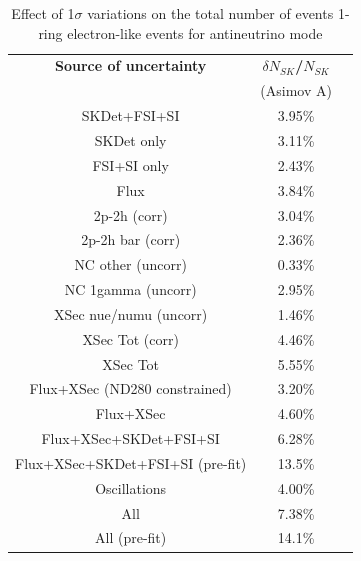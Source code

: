 \begin{table}[htb]
\centering
\begin{tabular}{| c | c | c |}
\hline
  {\bf Source of uncertainty}    & \multicolumn{1}{c|}{{\bf ${\delta}N_{SK}$/$N_{SK}$}}\\
                                 & \multicolumn{1}{c|}{(Asimov A)}\\

\hline
\hline  
SKDet+FSI+SI                   & 3.95\%                        \\
SKDet only                   & 3.11\%                        \\
FSI+SI only                   & 2.43\%                        \\
\hline
  Flux                           & 3.84\%                        \\
\hline
\hline
  2p-2h (corr)                     & 3.04\%                        \\
  2p-2h bar (corr)                  & 2.36\%                        \\
  NC other (uncorr)              & 0.33\%                        \\
  NC 1gamma (uncorr)             & 2.95\%                        \\
  XSec nue/numu (uncorr)                 & 1.46\%                        \\
\hline
  XSec Tot (corr)                  & 4.46\%                        \\
  XSec Tot                       & 5.55\%                        \\
\hline
\hline
  Flux+XSec (ND280 constrained)                      & 3.20\%                        \\
  Flux+XSec                      & 4.60\%                        \\
\hline
  Flux+XSec+SKDet+FSI+SI         & 6.28\%                        \\
  Flux+XSec+SKDet+FSI+SI (pre-fit)         & 13.5\%                        \\
\hline
\hline
  Oscillations                   & 4.00\%                        \\
\hline
\hline
  All                            & 7.38\%                        \\
      All (pre-fit) 		& 14.1\%				\\
\hline
\hline
\end{tabular}
\caption{
 Effect of 1$\sigma$ variations on the total number of events 1-ring electron-like events for antineutrino mode
}
\end{table}
